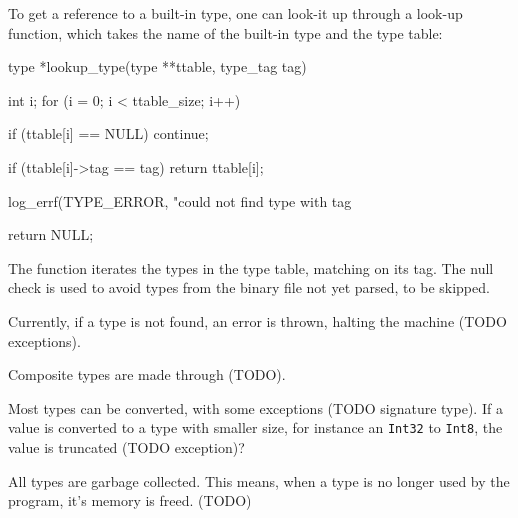 To get a reference to a built-in type, one can look-it up through a look-up
function, which takes the name of the built-in type and the type table:
\begin{ccode} %
type *lookup_type(type **ttable, type_tag tag)
{
    int i;
    for (i = 0; i < ttable_size; i++) {
        if (ttable[i] == NULL)
            continue;

        if (ttable[i]->tag == tag)
            return ttable[i];
    }

    log_errf(TYPE_ERROR, "could not find type with tag %

    return NULL;
}
\end{ccode}
The function iterates the types in the type table, matching on its tag. The null
check is used to avoid types from the binary file not yet parsed, to be skipped.

Currently, if a type is not found, an error is thrown, halting the machine (TODO
exceptions).

Composite types are made through (TODO).

Most types can be converted, with some exceptions (TODO signature type). If a
value is converted to a type with smaller size, for instance an {\tt Int32} to
{\tt Int8}, the value is truncated (TODO exception)?

All types are garbage collected. This means, when a type is no longer used by
the program, it's memory is freed. (TODO)
